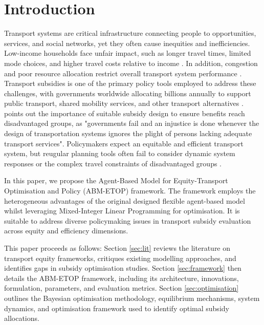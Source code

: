 \documentclass[a4paper,fleqn]{cas-sc}
\begin{document}
\section{Introduction}\label{sec:intro}
Transport systems are critical infrastructure connecting people to opportunities, services, and social networks, yet they often cause inequities and inefficiencies. Low-income households face unfair impact, such as longer travel times, limited mode choices, and higher travel costs relative to income \citep{Lucas2016, Allen2019}. In addition, congestion and poor resource allocation restrict overall transport system performance \citep{AFTABUZZAMAN20101}. Transport subsidies is one of the primary policy tools employed to address these challenges, with governments worldwide allocating billions annually to support public transport, shared mobility services, and other transport alternatives \citep{ITF2024}. \citep{Martens2016} points out the importance of suitable subsidy design to ensure benefits reach disadvantaged groups, as "governments fail and an injustice is done whenever the design of transportation systems ignores the plight of persons lacking adequate transport services". Policymakers expect an equitable and efficient transport system, but reugular planning tools often fail to consider dynamic system responses or the complex travel constraints of disadvantaged groups \citep{Pereira2017, Martens2017b}.

In this paper, we propose the Agent-Based Model for Equity-Transport Optimisation and Policy (ABM-ETOP) framework. The framework employs the heterogeneous advantages of the original designed flexible agent-based model whilst leveraging Mixed-Integer Linear Programming for optimisation. It is suitable to address diverse policymaking issues in transport subsidy evaluation across equity and efficiency dimensions. 

This paper proceeds as follows: Section \ref{sec:lit} reviews the literature on transport equity frameworks, critiques existing modelling approaches, and identifies gaps in subsidy optimisation studies. Section \ref{sec:framework} then details the ABM-ETOP framework, including its architecture, innovations, formulation, parameters, and evaluation metrics. Section \ref{sec:optimisation} outlines the Bayesian optimisation methodology, equilibrium mechanisms, system dynamics, and optimisation framework used to identify optimal subsidy allocations.
\end{document}
